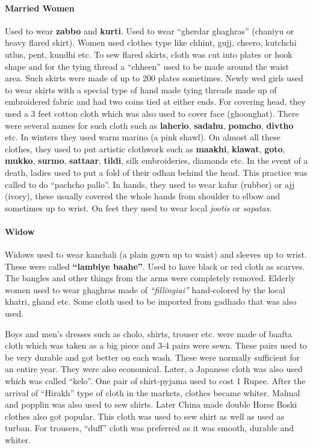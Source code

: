 \paragraph{Married Women} Used to wear \textbf{zabbo} and \textbf{kurti}. Used
to wear ``gherdar ghaghras'' (chaniyu or heavy flared skirt). Women used clothes
type like chhint, gujj, cheero, kutchchi utlus, pent, kundhi etc. To sew flared
skirts, cloth was cut into plates or hook shape and for the tying thread a
``chheen'' used to be made around the waist area. Such skirts were made of up to
200 plates sometimes. Newly wed girls used to wear skirts with a special type of
hand made tying threads made up of embroidered fabric and had two coins tied at
either ends. For covering head, they used a 3 feet cotton cloth which was also
used to cover face (ghoonghat). There were several names for such cloth such as
\textbf{laherio}, \textbf{sadahu}, \textbf{pomcho}, \textbf{divtho} etc. In
winters they used warm marino (a pink shawl). On almost all these clothes, they
used to put artistic clothwork such as \textbf{maakhi}, \textbf{klawat},
\textbf{goto}, \textbf{mukko}, \textbf{surmo}, \textbf{sattaar}, \textbf{tildi},
silk embroideries, diamonds etc. In the event of a death, ladies used to put a
fold of their odhan behind the head. This practice was called to do ``pachcho
pallo''. In hands, they used to wear kafur (rubber) or ajj (ivory), these
usually covered the whole hands from shoulder to elbow and sometimes up to wrist.
On feet they used to wear local \textit{jootis} or \textit{sapatas}.

\paragraph{Widow} Widows used to wear kanchali (a plain gown up to waist) and
sleeves up to wrist. These were called \textbf{``lambiye baahe''}. Used to have black or
red cloth as scarves. The bangles and other things from the arms were completely
removed. Elderly women used to wear ghaghras made of \textit{``fillingiai''} hand-colored
by the local khatri, ghand etc. Some cloth used to be imported from gadhado that
was also used.

Boys and men's dresses such as cholo, shirts, trouser etc. were made of baafta
cloth which was taken as a big piece and 3-4 pairs were sewn. These pairs used
to be very durable and got better on each wash. These were normally sufficient
for an entire year. They were also economical. Later, a Japanese cloth was also
used which was called ``kelo''. One pair of shirt-pyjama used to cost 1
Rupee. After the arrival of ``Hirakh'' type of cloth in the markets, clothes
became whiter. Malmal and popplin was also used to sew shirts. Later China
made double Horse Boski clothes also got popular. This cloth was used to sew
shirt as well as used as turban. For trousers, ``duff'' cloth was preferred
as it was smooth, durable and whiter.

